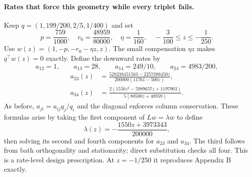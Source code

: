 \documentclass[11pt]{article}
\begin{document}
\paragraph{Rates that force this geometry while every triplet fails.}
Keep $q=(1,199/200,2/5,1/400)$ and set
\[
p=\frac{759}{1000},\quad r_0=\frac{48959}{80000},\quad
\eta=\frac1{160},\quad -\frac3{100}\leq z\leq-\frac1{250}.
\]
Use $w(z)=(1,-p,-r_0-\eta z,z)$. The small compensation $\eta z$ makes $q^\top w(z)=0$ exactly. Define the downward rates by
\[
a_{12}=1,\qquad a_{13}=28,\qquad a_{14}=249/10,\qquad a_{24}=4983/200,
\]
\begin{align*}
a_{23}(z)&=\frac{528238451563-2257386450z}{200000(11761-500z)},\\
a_{34}(z)&=\frac{2(1550z^2-5989657z+1197903)}{5(80500z+48959)}.
\end{align*}
As before, $a_{ji}=a_{ij}q_j/q_i$ and the diagonal enforces column conservation. These formulas arise by taking the first component of $Lw=\lambda w$ to define
\[
\lambda(z)=-\frac{1550z+3973343}{200000},
\]
then solving its second and fourth components for $a_{23}$ and $a_{34}$. The third follows from bath orthogonality and stationarity; direct substitution checks all four. This is a rate-level design prescription. At $z=-1/250$ it reproduces Appendix B exactly.
\end{document}
